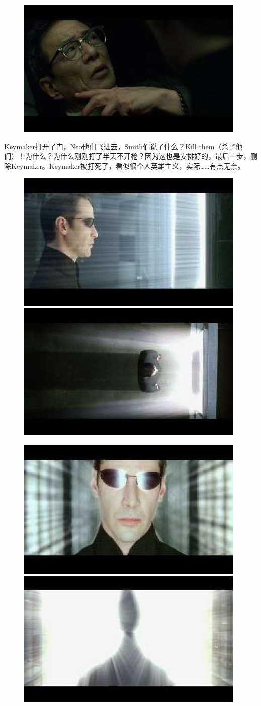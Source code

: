 \documentclass{ctexart}
\begin{document}
\begin{figure}[htb]
\centering
\includegraphics[width=0.5\linewidth]{fig/read_reloaded-153}
\end{figure}

Keymaker打开了门，Neo他们飞进去，Smith们说了什么？Kill them（杀了他们）！为什么？为什么刚刚打了半天不开枪？因为这也是安排好的，最后一步，删除Keymaker。Keymaker被打死了，看似很个人英雄主义，实际……有点无奈。

\begin{figure}[htb]
\centering
\includegraphics[width=0.45\linewidth]{fig/read_reloaded-154}
\includegraphics[width=0.45\linewidth]{fig/read_reloaded-154-1}

\vspace{3pt}

\includegraphics[width=0.45\linewidth]{fig/read_reloaded-154-2}
\includegraphics[width=0.45\linewidth]{fig/read_reloaded-154-3}
\end{figure}
\end{document}
